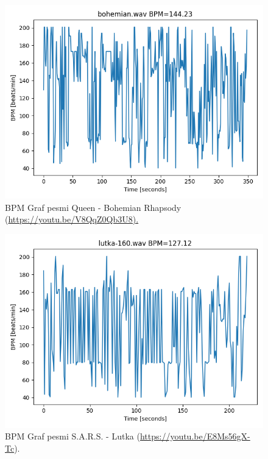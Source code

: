 \documentclass[a4paper,11pt]{article}
\begin{document}
\begin{figure}[htpb]
\begin{center}
\includegraphics[scale=0.6]{images/bohemian_bpm.png}
\caption{BPM Graf pesmi Queen - Bohemian Rhapsody (\url{https://youtu.be/V8QqZ0Qb3U8).}}
\label{bpm_bohrhap}
\end{center}
\end{figure}

\begin{figure}[htpb]
\begin{center}
\includegraphics[scale=0.6]{images/lutka_bpm.png}
\caption{BPM Graf pesmi S.A.R.S. - Lutka (\url{https://youtu.be/E8Ms56gX-Tc}).}
\label{bpm_lutka}
\end{center}
\end{figure}
\end{document}
